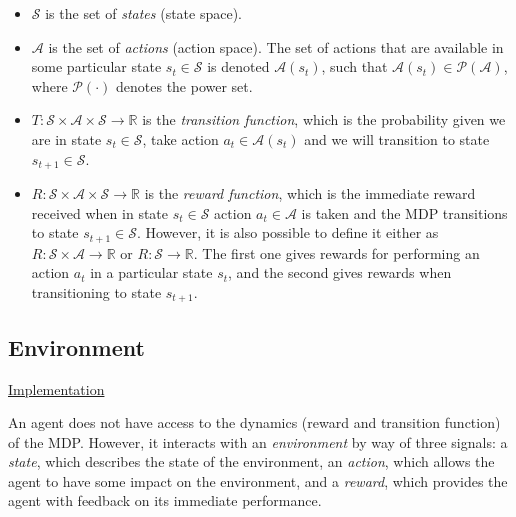\documentclass{article}
\begin{document}
\begin{itemize}

    \item $\mathcal{S}$ is the set of \emph{states} (state space).

    \item $\mathcal{A}$ is the set of \emph{actions} (action space). The set of actions that are
      available in some particular state $s_t \in \mathcal{S}$ is denoted $\mathcal{A}(s_t)$, such
      that $\mathcal{A}(s_t) \in \mathcal{P}(\mathcal{A})$, where $\mathcal{P}(\cdot)$ denotes the
      power set.

    \item $ T : \mathcal{S} \times \mathcal{A} \times \mathcal{S} \to \mathbb{R}$ is the
      \emph{transition function}, which is the probability given we are in state $s_t \in
      \mathcal{S}$, take action $a_t \in \mathcal{A}(s_t)$ and we will transition to state $s_{t+1}
      \in \mathcal{S}$.

    \item $ R : \mathcal{S} \times \mathcal{A} \times \mathcal{S} \to \mathbb{R}$ is the
      \emph{reward function}, which is the immediate reward received when in state $s_t \in
      \mathcal{S}$ action $a_t \in \mathcal{A}$ is taken and the MDP transitions to state $s_{t+1}
      \in \mathcal{S}$. However, it is also possible to define it either as $ R : \mathcal{S} \times
      \mathcal{A} \to \mathbb{R}$ or $R : \mathcal{S} \to \mathbb{R}$. The first one gives rewards
      for performing an action $a_t$ in a particular state $s_t$, and the second gives rewards when
      transitioning to state $s_{t+1}$.

\end{itemize}

\subsection{Environment}

\noindent
\href{https://github.com/davidrobles/mlnd-capstone-code/blob/master/capstone/environment/environment.py}
     {Implementation}
\break

An agent does not have access to the dynamics (reward and transition function) of the MDP. However,
it interacts with an \emph{environment} by way of three signals: a \emph{state}, which describes the
state of the environment, an \emph{action}, which allows the agent to have some impact on the
environment, and a \emph{reward}, which provides the agent with feedback on its immediate
performance.
\end{document}
